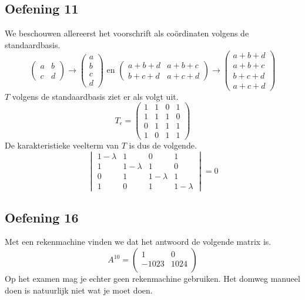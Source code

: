 \documentclass[lineaire_algebra_oplossingen.tex]{subfiles}
\begin{document}
\subsection{Oefening 11}
We beschouwen allereerst het voorschrift als co\"ordinaten volgens de standaardbasis.
\[
\begin{pmatrix}
a & b\\
c & d
\end{pmatrix}
\rightarrow
\begin{pmatrix}
a \\ b \\ c \\ d
\end{pmatrix}
\text{ en }
\begin{pmatrix}
a+b+d & a+b+c\\
b+c+d & a+c+d
\end{pmatrix}
\rightarrow
\begin{pmatrix}
a+b+d \\ a+b+c \\ b+c+d \\ a+c+d
\end{pmatrix}
\]
$T$ volgens de standaardbasis ziet er als volgt uit. 
\[
T_\epsilon =
\begin{pmatrix}
1 & 1 & 0 & 1\\
1 & 1 & 1 & 0\\
0 & 1 & 1 & 1\\
1 & 0 & 1 & 1
\end{pmatrix}
\]
De karakteristieke veelterm van $T$ is dus de volgende.
\[
\begin{vmatrix}
1-\lambda & 1 & 0 & 1\\
1 & 1-\lambda & 1 & 0\\
0 & 1 & 1-\lambda & 1\\
1 & 0 & 1 & 1-\lambda
\end{vmatrix}
= 0
\]


\subsection{Oefening 16}
Met een rekenmachine vinden we dat het antwoord de volgende matrix is.
\[
A^{10}=
\begin{pmatrix}
1 & 0\\
-1023 & 1024\\
\end{pmatrix}
\]
Op het examen mag je echter geen rekenmachine gebruiken.
Het domweg manueel doen is natuurlijk niet wat je moet doen.
\end{document}
